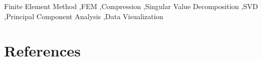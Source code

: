 \documentclass[preprint,12pt]{elsarticle}
\begin{document}
\begin{frontmatter}
\begin{abstract}
\end{abstract}

\begin{keyword}
Finite Element Method \sep FEM \sep Compression \sep Singular Value Decomposition \sep SVD \sep Principal Component Analysis \sep Data Visualization



\end{keyword}

\end{frontmatter}



















\section*{References}
\end{document}
